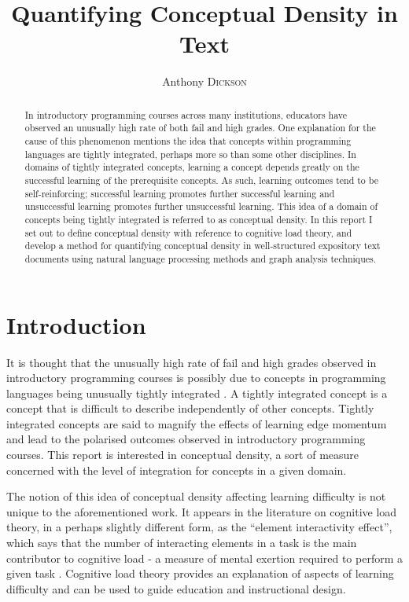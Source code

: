 \documentclass[12pt]{article}
\title{Quantifying Conceptual Density in Text}
\author{Anthony \textsc{Dickson}}
\begin{document}
\maketitle

\begin{abstract}
In introductory programming courses across many institutions, educators have observed an unusually high rate of both fail and high grades. One explanation for the cause of this phenomenon mentions the idea that concepts within programming languages are tightly integrated, perhaps more so than some other disciplines. In domains of tightly integrated concepts, learning a concept depends greatly on the successful learning of the prerequisite concepts. As such, learning outcomes tend to be self-reinforcing; successful learning promotes further successful learning and unsuccessful learning promotes further unsuccessful learning. This idea of a domain of concepts being tightly integrated is referred to as conceptual density.
In this report I set out to define conceptual density with reference to cognitive load theory, and develop a method for quantifying conceptual density in well-structured expository text documents using natural language processing methods and graph analysis techniques.
\end{abstract}

\tableofcontents
\clearpage

\section{Introduction}
It is thought that the unusually high rate of fail and high grades observed in introductory programming courses is possibly due to concepts in programming languages being unusually tightly integrated \citep{robins2010learning}. A tightly integrated concept is a concept that is difficult to describe independently of other concepts. Tightly integrated concepts are said to magnify the effects of learning edge momentum and lead to the polarised outcomes observed in introductory programming courses. This report is interested in conceptual density, a sort of measure concerned with the level of integration for concepts in a given domain.  

The notion of this idea of conceptual density affecting learning difficulty is not unique to the aforementioned work. It appears in the literature on cognitive load theory, in a perhaps slightly different form, as the ``element interactivity effect'', which says that the number of interacting elements in a task is the main contributor to cognitive load - a measure of mental exertion required to perform a given task \citep{sweller1994cognitive}. Cognitive load theory provides an explanation of aspects of learning difficulty and can be used to guide education and instructional design.
\end{document}
